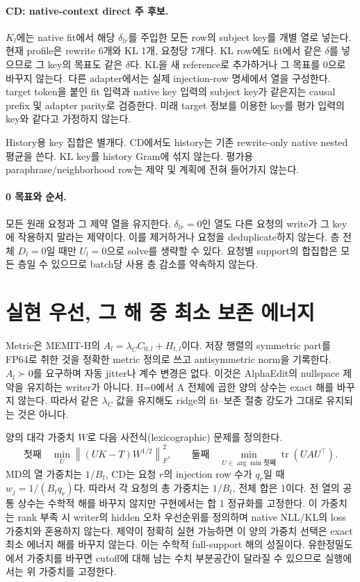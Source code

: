 \documentclass[11pt]{article}
\newcommand{\norm}[1]{\left\lVert #1\right\rVert}
\begin{document}
\paragraph{CD: native-context direct 주 후보.}
$K_l$에는 native fit에서 해당 $\delta_{lr}$를 주입한 모든 row의 subject
key를 개별 열로 넣는다. 현재 profile은 rewrite 6개와 KL 1개, 요청당 7개다.
KL row에도 fit에서 같은 $\delta$를 넣으므로 그 key의 목표도 같은 $\delta$다.
KL을 새 reference로 추가하거나 그 목표를 0으로 바꾸지 않는다.
다른 adapter에서는 실제 injection-row 명세에서 열을 구성한다.
target token을 붙인 fit 입력과 native key 입력의 subject key가 같은지는
causal prefix 및 adapter parity로 검증한다. 미래 target 정보를 이용한 key를
평가 입력의 key와 같다고 가정하지 않는다.

History용 key 집합은 별개다. CD에서도 history는 기존 rewrite-only native
nested 평균을 쓴다. KL key를 history Gram에 섞지 않는다.
평가용 paraphrase/neighborhood row는 제약 및 계획에 전혀 들어가지 않는다.

\paragraph{0 목표와 순서.}
모든 원래 요청과 그 제약 열을 유지한다. $\delta_{lr}=0$인 열도 다른 요청의
write가 그 key에 작용하지 말라는 제약이다. 이를 제거하거나 요청을 deduplicate하지
않는다. 층 전체 $D_l=0$일 때만 $U_l=0$으로 solve를 생략할 수 있다.
요청별 support의 합집합은 모든 층일 수 있으므로 batch당 사용 층 감소를 약속하지 않는다.

\section{실현 우선, 그 해 중 최소 보존 에너지}
Metric은 MEMIT-H의 $A_l=\lambda_C C_{0,l}+H_{t,l}$이다.
저장 행렬의 symmetric part를 FP64로 취한 것을 정확한 metric 정의로 쓰고
antisymmetric norm을 기록한다. $A_l\succ0$를 요구하며 자동 jitter나
계수 변경은 없다. 이것은 AlphaEdit의 nullspace 제약을 유지하는 writer가 아니다.
H=0에서 A 전체에 곱한 양의 상수는 exact 해를 바꾸지 않는다. 따라서 같은
$\lambda_C$ 값을 유지해도 ridge의 fit--보존 절충 강도가 그대로 유지되는 것은 아니다.

양의 대각 가중치 $W$로 다음 사전식(lexicographic) 문제를 정의한다.
\[
 \text{첫째}\quad \min_U \norm{(UK-T)W^{1/2}}_F^2,
 \qquad
 \text{둘째}\quad \min_{U\in\arg\min\mathrm{첫째}}
                 \operatorname{tr}(UAU^\top).
\]
MD의 열 가중치는 $1/B_t$, CD는 요청 $r$의 injection row 수가 $q_r$일 때
$w_j=1/(B_tq_r)$다. 따라서 각 요청의 총 가중치는 $1/B_t$, 전체 합은 1이다.
전 열의 공통 상수는 수학적 해를 바꾸지 않지만 구현에서는 합 1 정규화를 고정한다.
이 가중치는 rank 부족 시 writer의 hidden 오차
우선순위를 정의하며 native NLL/KL의 loss 가중치와 혼용하지 않는다.
제약이 정확히 실현 가능하면 이 양의 가중치 선택은 exact 최소 에너지 해를 바꾸지 않는다.
이는 수학적 full-support 해의 성질이다. 유한정밀도에서 가중치를 바꾸면 cutoff에
대해 남는 수치 부분공간이 달라질 수 있으므로 실행에서는 위 가중치를 고정한다.
\end{document}
